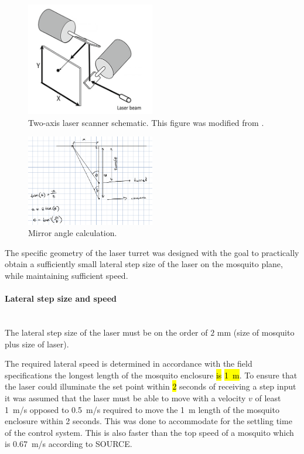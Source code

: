\begin{figure}[h]
    \centering
    \includegraphics[width=0.5\textwidth]{figures/2_axis_laser_scanner.png}
    \caption{Two-axis laser scanner schematic. This figure was modified from \cite{2-axis-scanner-schematic}.}
    \label{fig:2-axis-laser-scanner-schematic}
\end{figure}

\begin{figure}[h]
    \centering
    \includegraphics[width=0.5\textwidth]{figures/mirror_angle.png}
    \caption{Mirror angle calculation.}
    \label{fig:mirror_angle}
\end{figure}

The specific geometry of the laser turret was designed with the goal to practically obtain a sufficiently small lateral step size of the laser on the mosquito plane, while maintaining sufficient speed.

\paragraph{Lateral step size and speed}\mbox{}\\
\newcommand{\requiredLatStepSizeMM}{2} %
The lateral step size of the laser must be on the order of $\requiredLatStepSizeMM$ mm (size of mosquito plus size of laser).

\newcommand{\requiredLatSpeedMPS}{1} %
The required lateral speed is determined in accordance with the field specifications the longest length of the mosquito enclosure \hl{is} \hl{1~m}. To ensure that the laser could illuminate the set point within \hl{2} seconds of receiving a step input it was assumed that the laser must be able to move with a velocity $v$ of least \requiredLatSpeedMPS~m/s opposed to 0.5~m/s required to move the 1~m length of the mosquito enclosure within 2 seconds. This was done to accommodate for the settling time of the control system. This is also faster than the top speed of a mosquito which is 0.67~m/s according to SOURCE.

